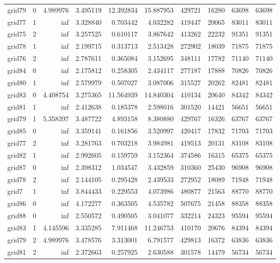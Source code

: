 \begin{longtable}{|l|r|r|r|r|r|r|r|r|r|}
grid79 & 0 & 4.989976 & 3.495119 & 12.392834 & 15.887953 & 429721 & 16280 & 63698 & 63698 \\
grid77 & 1 & inf & 3.328840 & 0.703442 & 4.032282 & 419447 & 20065 & 83011 & 83011 \\
grid75 & 2 & inf & 3.257525 & 0.610117 & 3.867642 & 413262 & 22232 & 91351 & 91351 \\
grid78 & 1 & inf & 2.199715 & 0.313713 & 2.513428 & 272902 & 18039 & 71875 & 71875 \\
grid76 & 2 & inf & 2.787611 & 0.365084 & 3.152695 & 348111 & 17782 & 71140 & 71140 \\
grid84 & 0 & inf & 2.175812 & 0.258305 & 2.434117 & 277187 & 17888 & 70826 & 70826 \\
grid80 & 1 & inf & 2.579979 & 0.507027 & 3.087006 & 315527 & 20262 & 82481 & 82481 \\
grid83 & 0 & 4.408754 & 3.275365 & 11.564939 & 14.840304 & 410134 & 20640 & 84342 & 84342 \\
grid81 & 1 & inf & 2.412638 & 0.185378 & 2.598016 & 301520 & 14421 & 56651 & 56651 \\
grid79 & 1 & 5.358397 & 3.487722 & 4.893158 & 8.380880 & 429767 & 16326 & 63767 & 63767 \\
grid85 & 0 & inf & 3.359141 & 0.161856 & 3.520997 & 420417 & 17832 & 71703 & 71703 \\
grid77 & 2 & inf & 3.281763 & 0.703218 & 3.984981 & 419513 & 20131 & 83108 & 83108 \\
grid82 & 1 & inf & 2.992605 & 0.159759 & 3.152364 & 374586 & 16315 & 65375 & 65375 \\
grid87 & 0 & inf & 2.398312 & 1.034547 & 3.432859 & 310360 & 25430 & 96908 & 96908 \\
grid78 & 2 & inf & 2.144105 & 0.295428 & 2.439533 & 272952 & 18089 & 71948 & 71948 \\
grid7 & 1 & inf & 3.844433 & 0.229553 & 4.073986 & 480877 & 21563 & 88770 & 88770 \\
grid86 & 0 & inf & 4.172277 & 0.363505 & 4.535782 & 507675 & 21458 & 88358 & 88358 \\
grid88 & 0 & inf & 2.550572 & 0.490505 & 3.041077 & 332214 & 24323 & 95594 & 95594 \\
grid83 & 1 & 4.145596 & 3.335285 & 7.911468 & 11.246753 & 410170 & 20676 & 84394 & 84394 \\
grid79 & 2 & 4.989976 & 3.478576 & 3.313001 & 6.791577 & 429813 & 16372 & 63836 & 63836 \\
grid81 & 2 & inf & 2.372663 & 0.257925 & 2.630588 & 301578 & 14479 & 56734 & 56734 \\

\end{longtable}
